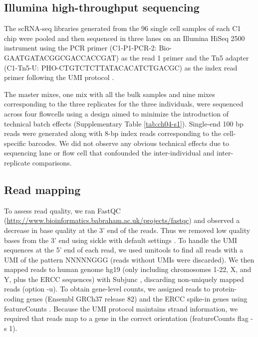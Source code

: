 \subsection{Illumina high-throughput
sequencing}\label{illumina-high-throughput-sequencing}

The scRNA-seq libraries generated from the 96 single cell samples of
each C1 chip were pooled and then sequenced in three lanes on an
Illumina HiSeq 2500 instrument using the PCR primer (C1-P1-PCR-2:
Bio-GAATGATACGGCGACCACCGAT) as the read 1 primer and the Tn5 adapter
(C1-Tn5-U: PHO-CTGTCTCTTATACACATCTGACGC) as the index read primer
following the UMI protocol \citep{Islam2014}.

The master mixes, one mix with all the bulk samples and nine mixes
corresponding to the three replicates for the three individuals, were
sequenced across four flowcells using a design aimed to minimize the
introduction of technical batch effects (Supplementary Table
\ref{tab:ch04-s1}).  Single-end 100 bp reads were generated along with
8-bp index reads corresponding to the cell-specific barcodes. We did
not observe any obvious technical effects due to sequencing lane or
flow cell that confounded the inter-individual and inter-replicate
comparisons.

\subsection{Read mapping}\label{read-mapping}

To assess read quality, we ran FastQC
(\url{http://www.bioinformatics.babraham.ac.uk/projects/fastqc}) and
observed a decrease in base quality at the 3' end of the reads. Thus
we removed low quality bases from the 3' end using sickle with default
settings \citep{Joshi2011}. To handle the UMI sequences at the 5' end
of each read, we used umitools \citep{umitools} to find all reads with
a UMI of the pattern NNNNNGGG (reads without UMIs were discarded). We
then mapped reads to human genome hg19 (only including chromosomes
1-22, X, and Y, plus the ERCC sequences) with Subjunc
\citep{Liao2013}, discarding non-uniquely mapped reads (option -u). To
obtain gene-level counts, we assigned reads to protein-coding genes
(Ensembl GRCh37 release 82) and the ERCC spike-in genes using
featureCounts \citep{Liao2014}. Because the UMI protocol maintains
strand information, we required that reads map to a gene in the
correct orientation (featureCounts flag -s 1).

